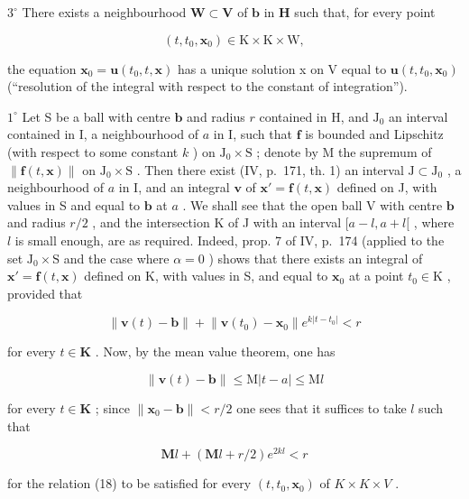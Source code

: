 \(3^{\circ}\) There exists a neighbourhood \(\mathbf{W} \subset \mathbf{V}\) of \(\mathbf{b}\) in \(\mathbf{H}\) such that, for every point

\[
(t, t _ {0}, \mathbf {x} _ {0}) \in \mathrm{K} \times \mathrm{K} \times \mathrm{W},
\]

the equation \(\mathbf{x}_{0} = \mathbf{u}(t_{0}, t, \mathbf{x})\) has a unique solution x on V equal to \(\mathbf{u}(t, t_{0}, \mathbf{x}_{0})\) (``resolution of the integral with respect to the constant of integration'').

\(1^{\circ}\) Let S be a ball with centre \(\mathbf{b}\) and radius \(r\) contained in H, and \(\mathrm{J}_0\) an interval contained in I, a neighbourhood of \(a\) in I, such that \(\mathbf{f}\) is bounded and Lipschitz (with respect to some constant \(k\) ) on \(\mathrm{J}_0 \times \mathrm{S}\) ; denote by M the supremum of \(\| \mathbf{f}(t, \mathbf{x})\|\) on \(\mathrm{J}_0 \times \mathrm{S}\) . Then there exist (IV, p.~171, th. 1) an interval \(\mathrm{J} \subset \mathrm{J}_0\) , a neighbourhood of \(a\) in I, and an integral \(\mathbf{v}\) of \(\mathbf{x}' = \mathbf{f}(t, \mathbf{x})\) defined on J, with values in S and equal to \(\mathbf{b}\) at \(a\) . We shall see that the open ball V with centre \(\mathbf{b}\) and radius \(r/2\) , and the intersection K of J with an interval \([a - l, a + l[\) , where \(l\) is small enough, are as required. Indeed, prop. 7 of IV, p.~174 (applied to the set \(\mathrm{J}_0 \times \mathrm{S}\) and the case where \(\alpha = 0\) ) shows that there exists an integral of \(\mathbf{x}' = \mathbf{f}(t, \mathbf{x})\) defined on K, with values in S, and equal to \(\mathbf{x}_0\) at a point \(t_0 \in \mathrm{K}\) , provided that

\[
\left\| \mathbf {v} (t) - \mathbf {b} \right\| + \left\| \mathbf {v} (t _ {0}) - \mathbf {x} _ {0} \right\| e ^ {k | t - t _ {0} |} <   r\tag{18}
\]

for every \(t \in \mathbf{K}\) . Now, by the mean value theorem, one has

\[
\| \mathbf {v} (t) - \mathbf {b} \| \leqslant \mathrm{M} | t - a | \leqslant \mathrm{M} l
\]

for every \(t \in \mathbf{K}\) ; since \(\| \mathbf{x}_0 - \mathbf{b} \| < r / 2\) one sees that it suffices to take \(l\) such that

\[
\mathbf {M} l + (\mathbf {M} l + r / 2) e ^ {2 k l} <   r\tag{19}
\]

for the relation (18) to be satisfied for every \((t, t_{0}, \mathbf{x}_{0})\) of \(K \times K \times V\) .

